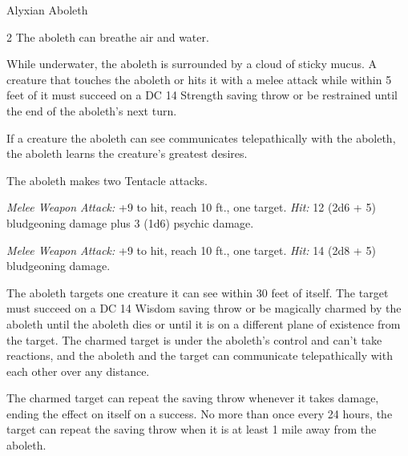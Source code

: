 \documentclass[10pt,a4paper,twoside,bg=none,twocolumn,openany,nodeprecatedcode]{dndbook}
\begin{document}
\begin{DndMonster}[float*=b,width=\textwidth + 8pt]{Alyxian Aboleth}
\begin{multicols}{2}
\DndMonsterBasics[
armor-class = {17 (natural armor)},
hit-points = {\DndDice{18d10 + 36}},
speed = {10 ft., swim 30 ft.}
]
\DndMonsterAbilityScores[
 str = 21,
 dex = 9,
 con = 15,
 int = 18,
 wis = 18,
 cha = 18
]
\DndMonsterDetails[
saving-throws = {Con +6, Int +8, Wis +8},
skills = {History +12, Perception +12},
senses = {darkvision 120 ft., passive perception 22},
languages = {Deep Speech, telepathy 120 ft.},
challenge = 12,
]
The aboleth can breathe air and water.

While underwater, the aboleth is surrounded by a cloud of sticky mucus. A creature that touches the aboleth or hits it with a melee attack while within 5 feet of it must succeed on a DC 14 Strength saving throw or be restrained until the end of the aboleth's next turn.

If a creature the aboleth can see communicates telepathically with the aboleth, the aboleth learns the creature's greatest desires.

\par
{}
The aboleth makes two Tentacle attacks.

\textsl{Melee Weapon Attack:} +9 to hit, reach 10 ft., one target. \textsl{Hit:} 12 (2d6 + 5) bludgeoning damage plus 3 (1d6) psychic damage.

\textsl{Melee Weapon Attack:} +9 to hit, reach 10 ft., one target. \textsl{Hit:} 14 (2d8 + 5) bludgeoning damage.

\par
{}
The aboleth targets one creature it can see within 30 feet of itself. The target must succeed on a DC 14 Wisdom saving throw or be magically charmed by the aboleth until the aboleth dies or until it is on a different plane of existence from the target. The charmed target is under the aboleth's control and can't take reactions, and the aboleth and the target can communicate telepathically with each other over any distance.

The charmed target can repeat the saving throw whenever it takes damage, ending the effect on itself on a success. No more than once every 24 hours, the target can repeat the saving throw when it is at least 1 mile away from the aboleth.


\end{multicols}
\end{DndMonster}
\end{document}
